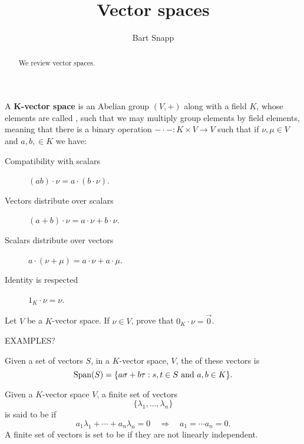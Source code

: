 \documentclass{ximera}
\author{Bart Snapp}
\title{Vector spaces}
\begin{document}
\begin{abstract}
  We review vector spaces.
\end{abstract}
\maketitle



\begin{definition}
  A \textbf{$\boldsymbol{K}$-vector space} is an Abelian group $(V,+)$
  along with a field $K$, whose elements are called ,
  such that we may multiply group elements by field elements, meaning
  that there is a binary operation $-\cdot-: K\times V \to V$ such that
  if $\nu,\mu\in V$ and $a,b,\in K$ we have:
\begin{description}
\item[Compatibility with scalars] $(ab)\cdot \nu = a\cdot (b\cdot \nu)$.
\item[Vectors distribute over scalars] $(a+b)\cdot \nu =
  a\cdot\nu + b\cdot \nu$.
\item[Scalars distribute over vectors] $a\cdot (\nu+\mu) =
  a\cdot \nu + a\cdot \mu$.
\item[Identity is respected] $1_K\cdot \nu = \nu$.
\end{description}
\end{definition}

\begin{exercise}
  Let $V$ be a $K$-vector space. If $\nu\in V$, prove that
  $0_K\cdot \nu = \vec{0}$.
\end{exercise}

\begin{example}[Polynomials]
  EXAMPLES?
\end{example}



\begin{definition}
  Given a set of vectors $S$, in a $K$-vector space, $V$, the
   of these vectors is
  \[
  \operatorname{Span}(S) = \{a\sigma+b\tau:\text{$s,t\in S$ and $a,b\in K$}\}.
  \]
\end{definition}


\begin{definition}
  Given a $K$-vector space $V$, a finite set of vectors
  \[
  \{\lambda_1,\dots,\lambda_n\}
  \]
  is said to be  if
  \[
  a_1\lambda_1 + \cdots + a_n\lambda_n = 0\quad \Rightarrow \quad a_1= \cdots a_n = 0.
  \]
  A finite set of vectors is set to be  if
  they are not linearly independent.
\end{definition}
\end{document}
